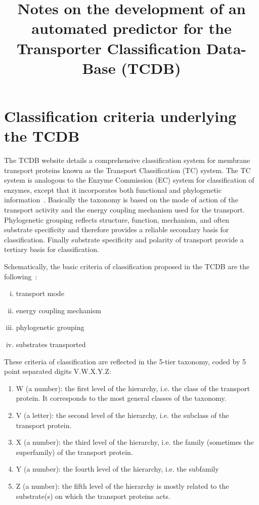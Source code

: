 \documentclass[english]{article}
\begin{document}
\title{Notes on the development of an automated predictor for the Transporter Classification Data-Base (TCDB)}

\author{}
\maketitle

\tableofcontents





\section{Classification criteria underlying the TCDB}
\label{}
The TCDB website details a comprehensive classification system for membrane transport proteins known as the Transport Classification (TC) system. The TC system is analogous to the Enzyme Commission (EC) system for classification of enzymes, except that it incorporates both functional and phylogenetic information~\cite{Saier06,Saier14}. 
Basically the taxonomy is based on the mode of action of the transport activity and the energy coupling mechanism used for the transport.
Phylogenetic grouping reflects structure, function, mechanism, and often substrate specificity and therefore provides a reliable secondary basis for classification. Finally substrate specificity and polarity of transport provide a tertiary basis for classification.

Schematically, the basic criteria of classification proposed in the TCDB are the following~\cite{Saier00}:
\begin{enumerate}[i.]
\item transport mode
\item energy coupling mechanism
\item phylogenetic grouping
\item substrates transported
\end{enumerate}


These criteria of classification are reflected in the 5-tier taxonomy, coded by 5  point separated digits V.W.X.Y.Z:
\begin{enumerate}
\item W (a number): the first level of the hierarchy, i.e. the class of the transport protein. It corresponds to the most general classes of the taxonomy.
\item V (a letter): the second level of the hierarchy, i.e. the subclass of the transport protein. 
\item X (a number): the third level of the hierarchy, i.e. the family (sometimes the superfamily) of the transport protein. 
\item Y (a number): the fourth level of the hierarchy, i.e. the subfamily  
\item Z (a number): the fifth level of the hierarchy is mostly related to the substrate(s) on which the transport proteins acts. 
\end{enumerate}
\end{document}
